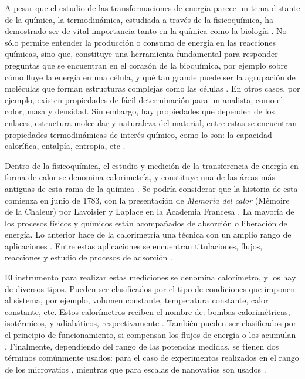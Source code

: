 	A pesar que el estudio de las transformaciones de energía parece un tema distante de la química, la termodinámica, estudiada a través de la fisicoquímica, ha demostrado ser de vital importancia tanto en la química como la biología \cite{atkins2011physical}. No sólo permite entender la producción o consumo de energía en las reacciones químicas, sino que, constituye una herramienta fundamental para responder preguntas que se encuentran en el corazón de la bioquímica, por ejemplo sobre cómo fluye la energía en una célula, y qué tan grande puede ser la agrupación de moléculas que forman estructuras complejas como las células \cite{atkins2011physical}. En otros casos, por ejemplo, existen propiedades de fácil determinación para un analista, como el color, masa y densidad. Sin embargo, hay propiedades que dependen de los enlaces, estructura molecular y naturaleza del material, entre estas se encuentran propiedades termodinámicas de interés químico, como lo son: la capacidad calorífica, entalpía, entropía, etc \cite{gaisford2016principles}.
	
	Dentro de la fisicoquímica, el estudio y medición de la transferencia de energía en forma de calor se denomina calorimetría, y constituye una de las áreas más antiguas de esta rama de la química \cite{zielenkiewicz2006theory}. Se podría considerar que la historia de esta comienza en junio de 1783, con la presentación de \textit{Memoria del calor} (Mémoire de la Chaleur) por Lavoisier y Laplace en la Academia Francesa \cite{zielenkiewicz2006theory}. La mayoría de los procesos físicos y químicos están acompañados de absorción o liberación de energía. Lo anterior hace de la calorimetría una técnica con un amplio rango de aplicaciones \cite{wadso2001standards}. Entre estas aplicaciones se encuentran titulaciones, flujos, reacciones y estudio de procesos de adsorción \cite{gaisford2016principles}.
		
	El instrumento para realizar estas mediciones se denomina calorímetro, y los hay de diversos tipos. Pueden ser clasificados por el tipo de condiciones que imponen al sistema, por ejemplo, volumen constante, temperatura constante, calor constante, etc. Estos calorímetros reciben el nombre de: bombas calorimétricas, isotérmicos, y adiabáticos, respectivamente \cite{gaisford2016principles, wadso2001standards}. También pueden ser clasificados por el principio de funcionamiento, si compensan los flujos de energía o los acumulan \cite{gaisford2016principles}. Finalmente, dependiendo del rango de las potencias medidas, se tienen dos términos comúnmente usados:  para el caso de experimentos realizados en el rango de los microvatios \cite{wadso2001standards, wadso2003new}, mientras que para escalas de nanovatios son usados  \cite{wadso2003new}.
	
